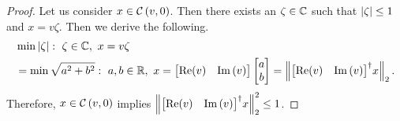 %
\begin{proof}
Let us consider $x\in\cztope{v}{0}$.  Then there exists an
$\zeta\in\compnums$ such that $\absolute{\zeta}\leq 1$ and
$x=v\zeta$.  Then we derive the following.
%
\begin{align*}
& \min{\absolute{\zeta}:~\zeta\in\compnums,~x=v\zeta}\\
& =\min{\sqrt{a^2+b^2}:~a,b\in\reals,~x=\mymatrix{\real(v)
& \img\lt(v\rt)}\mymatrix{a\\b}}=\norm{\pinv{\mymatrix{\real(v)
& \img\lt(v\rt)}}x}.
\end{align*}
%
Therefore, $x\in\cztope{v}{0}$ implies $\norm{\pinv{\mymatrix{\real(v)
& \img\lt(v\rt)}}x}^2\leq 1$.
\end{proof}
%

  

